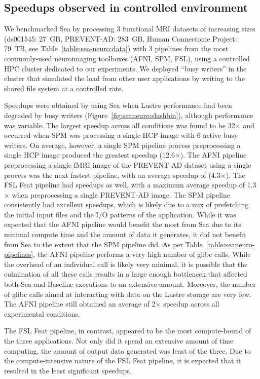 \documentclass[fleqn,10pt]{wlscirep}
\begin{document}
\subsection{Speedups observed in controlled environment}

We benchmarked Sea by processing 3 functional MRI datasets of increasing sizes
(ds001545: 27~GB, PREVENT-AD: 283~GB, Human Connectome Project: 79~TB, see
Table~\ref{table:sea-neuro:data}) with 3 pipelines 
from the most commonly-used neuroimaging toolboxes (AFNI, SPM, FSL), using a controlled HPC cluster 
dedicated to our experiments. We deployed ``busy writers'' in the cluster
that simulated the load from other user applications by writing to the shared file system at a controlled rate.

Speedups were obtained by using Sea when Lustre
performance had been degraded by busy writers (Figure~\ref{fig:seaneuro:slashbin}),
although performance was variable. The largest speedup across all conditions
was found to be 32$\times$ and occurred when SPM was processing a single
HCP image with 6 active busy writers.
On average, however, a single SPM pipeline
process preprocessing a single HCP image produced the greatest speedup
(12.6$\times$). The AFNI pipeline preprocessing a single fMRI image of the PREVENT-AD dataset
using a single process was the next fastest pipeline, with an average speedup of
(4.3$\times$). The FSL Feat pipeline had speedups as well, with a maximum average speedup of
1.3$\times$ when preprocessing a single PREVENT-AD image. The SPM pipeline consistently had
excellent speedups, which is likely due to a mix of prefetching the initial
input files and the I/O patterns of the application. While it was expected that the
AFNI pipeline would benefit the most from Sea due to its
minimal compute time and the amount of data it generates, it did not benefit
from Sea to the extent that the SPM pipeline did. As per Table~\ref{table:seaneuro-pipelines}, the
AFNI pipeline performs a very high number of glibc calls. While the overhead of an
individual call is likely very minimal, it is possible that the culmination of
all these calls results in a large enough bottleneck that affected both Sea and
Baseline executions to an extensive amount. Moreover, the number of glibc calls
aimed at interacting with data on the Lustre storage are very few. The AFNI pipeline still
obtained an average of 2$\times$ speedup across all experimental conditions.

The FSL Feat pipeline, in contrast, appeared to be the most compute-bound of the three
applications. Not only did it spend an extensive amount of time computing, the
amount of output data generated was least of the three. Due to the
compute-intensive nature of the FSL Feat pipeline, it is expected that it resulted in the
least significant speedups.
\end{document}
